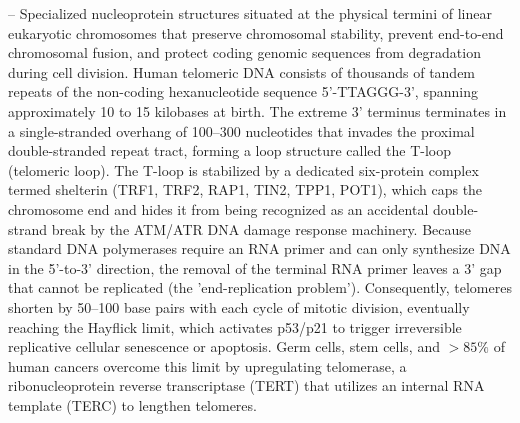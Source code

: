 -- Specialized nucleoprotein structures situated at the physical termini of linear eukaryotic chromosomes that preserve chromosomal stability, prevent end-to-end chromosomal fusion, and protect coding genomic sequences from degradation during cell division. Human telomeric DNA consists of thousands of tandem repeats of the non-coding hexanucleotide sequence 5'-TTAGGG-3', spanning approximately 10 to 15 kilobases at birth. The extreme 3' terminus terminates in a single-stranded overhang of 100--300 nucleotides that invades the proximal double-stranded repeat tract, forming a loop structure called the T-loop (telomeric loop). The T-loop is stabilized by a dedicated six-protein complex termed shelterin (TRF1, TRF2, RAP1, TIN2, TPP1, POT1), which caps the chromosome end and hides it from being recognized as an accidental double-strand break by the ATM/ATR DNA damage response machinery. Because standard DNA polymerases require an RNA primer and can only synthesize DNA in the 5'-to-3' direction, the removal of the terminal RNA primer leaves a 3' gap that cannot be replicated (the 'end-replication problem'). Consequently, telomeres shorten by 50--100 base pairs with each cycle of mitotic division, eventually reaching the Hayflick limit, which activates p53/p21 to trigger irreversible replicative cellular senescence or apoptosis. Germ cells, stem cells, and $>85\%$ of human cancers overcome this limit by upregulating telomerase, a ribonucleoprotein reverse transcriptase (TERT) that utilizes an internal RNA template (TERC) to lengthen telomeres.

